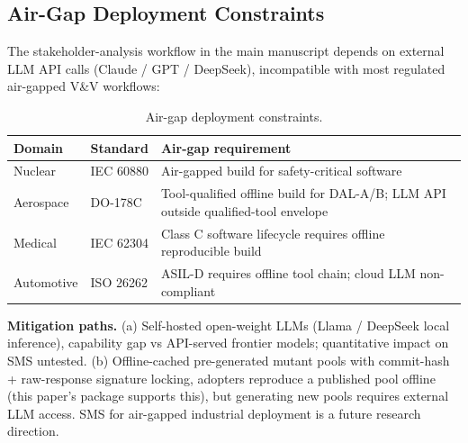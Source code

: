 \documentclass[manuscript,screen,review]{acmart}
\begin{document}
\subsection{Air-Gap Deployment Constraints}\label{e.1-air-gap-incompatibility-full-justification}

The stakeholder-analysis workflow in the main manuscript depends on external LLM API calls (Claude / GPT /
DeepSeek), incompatible with most regulated air-gapped V\&V workflows:

{%
\begin{longtable}[]{@{}
  >{\raggedright\arraybackslash}p{}
  >{\raggedright\arraybackslash}p{}
  >{\raggedright\arraybackslash}p{}@{}}
\caption{Air-gap deployment constraints.}\label{tab:p2-25}\\
\toprule\noalign{}
\begin{minipage}[b]{\linewidth}\raggedright
Domain
\end{minipage} & \begin{minipage}[b]{\linewidth}\raggedright
Standard
\end{minipage} & \begin{minipage}[b]{\linewidth}\raggedright
Air-gap requirement
\end{minipage} \\
\midrule\noalign{}
\endfirsthead
\endhead
\bottomrule\noalign{}
\endlastfoot
Nuclear & IEC 60880 & Air-gapped build for safety-critical software \\
Aerospace & DO-178C & Tool-qualified offline build for DAL-A/B; LLM API
outside qualified-tool envelope \\
Medical & IEC 62304 & Class C software lifecycle requires offline
reproducible build \\
Automotive & ISO 26262 & ASIL-D requires offline tool chain; cloud LLM
non-compliant \\
\end{longtable}
}

\textbf{Mitigation paths.} (a) Self-hosted open-weight LLMs (Llama
/ DeepSeek local inference), capability gap vs API-served frontier
models; quantitative impact on SMS untested. (b) Offline-cached
pre-generated mutant pools with commit-hash + raw-response signature
locking, adopters reproduce a published pool offline (this paper's
package supports this), but generating new pools requires external LLM
access. SMS for air-gapped industrial deployment is a future research
direction.
\end{document}
